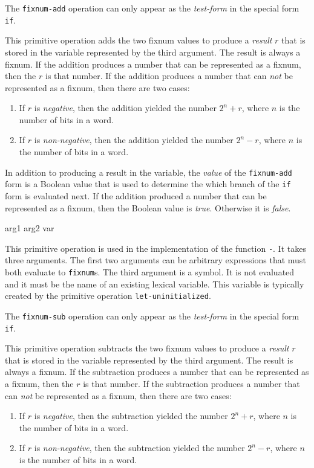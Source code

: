 The \texttt{fixnum-add} operation can only appear as the
\emph{test-form} in the special form \texttt{if}.

This primitive operation adds the two fixnum values to produce a
\emph{result} $r$ that is stored in the variable represented by the
third argument.  The result is always a fixnum.  If the addition
produces a number that can be represented as a fixnum, then the $r$
is that number.  If the addition produces a number that can \emph{not}
be represented as a fixnum, then there are two cases:

\begin{enumerate}
\item If $r$ is \emph{negative}, then the addition yielded the number
  $2^n + r$, where $n$ is the number of bits in a word.
\item If $r$ is \emph{non-negative}, then the addition yielded the
  number $2^n - r$, where $n$ is the number of bits in a word.
\end{enumerate}

In addition to producing a result in the variable, the \emph{value} of
the \texttt{fixnum-add} form is a Boolean value that is used to
determine the which branch of the \texttt{if} form is evaluated next.
If the addition produced a number that can be represented as a fixnum,
then the Boolean value is \emph{true}.  Otherwise it is \emph{false}.

 {arg1 arg2 var}

This primitive operation is used in the implementation of the
\commonlisp{} function \texttt{-}.  It takes three arguments.  The
first two arguments can be arbitrary expressions that must both
evaluate to \texttt{fixnum}s.   The third argument is a symbol.  It is
not evaluated and it must be the name of an existing lexical
variable.  This variable is typically created by the primitive
operation \texttt{let-uninitialized}.

The \texttt{fixnum-sub} operation can only appear as the
\emph{test-form} in the special form \texttt{if}.

This primitive operation subtracts the two fixnum values to produce a
\emph{result} $r$ that is stored in the variable represented by the
third argument.  The result is always a fixnum.  If the subtraction
produces a number that can be represented as a fixnum, then the $r$ is
that number.  If the subtraction produces a number that can \emph{not}
be represented as a fixnum, then there are two cases:

\begin{enumerate}
\item If $r$ is \emph{negative}, then the subtraction yielded the
  number $2^n + r$, where $n$ is the number of bits in a word.
\item If $r$ is \emph{non-negative}, then the subtraction yielded the
  number $2^n - r$, where $n$ is the number of bits in a word.
\end{enumerate}

